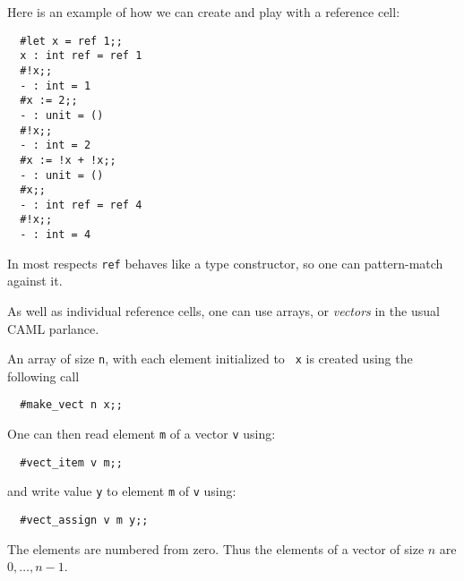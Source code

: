 \begin{slide*}


\vspace*{0.5cm}

Here is an example of how we can create and play with a reference cell:

\begin{black}\begin{verbatim}
  #let x = ref 1;;
  x : int ref = ref 1
  #!x;;
  - : int = 1
  #x := 2;;
  - : unit = ()
  #!x;;
  - : int = 2
  #x := !x + !x;;
  - : unit = ()
  #x;;
  - : int ref = ref 4
  #!x;;
  - : int = 4
\end{verbatim}\end{black}

In most respects {\black \tt ref} behaves like a type constructor, so one
can pattern-match against it.

\end{slide*}




\begin{slide*}


\vspace*{0.5cm}

As well as individual reference cells, one can use arrays, or {\em vectors} in
the usual CAML parlance.

An array of  size {\black \tt n}, with each element initialized to {\black \tt
x} is created using the following call

\begin{black}\begin{verbatim}
  #make_vect n x;;
\end{verbatim}\end{black}

\noindent One can then read element {\black \tt m} of a vector {\black \tt v}
using:

\begin{black}\begin{verbatim}
  #vect_item v m;;
\end{verbatim}\end{black}

\noindent and write value {\black \tt y} to element {\black \tt m} of {\black
\tt v} using:

\begin{black}\begin{verbatim}
  #vect_assign v m y;;
\end{verbatim}\end{black}

\noindent The elements are numbered from zero. Thus the elements of a vector of
size {\red $n$} are {\red $0,\ldots,n-1$}.

\end{slide*}



